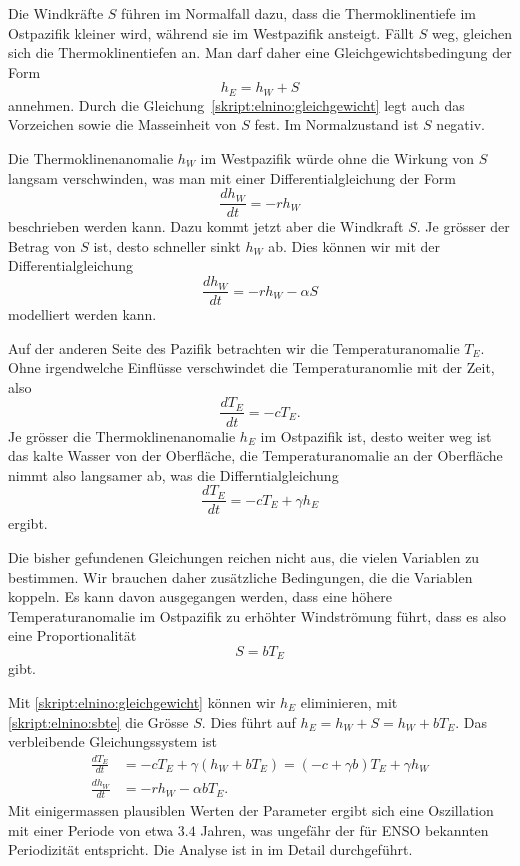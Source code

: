 Die Windkräfte $S$ führen im Normalfall dazu, dass die Thermoklinentiefe
im Ostpazifik kleiner wird, während sie im Westpazifik ansteigt.
Fällt $S$ weg, gleichen sich die Thermoklinentiefen an.
Man darf daher eine Gleichgewichtsbedingung der Form
\begin{equation}
h_E = h_W + S
\label{skript:elnino:gleichgewicht}
\end{equation}
annehmen.
Durch die Gleichung~\ref{skript:elnino:gleichgewicht} legt auch
das Vorzeichen sowie die Masseinheit von $S$ fest.
Im Normalzustand ist $S$ negativ.

Die Thermoklinenanomalie $h_W$ im Westpazifik würde ohne die Wirkung
von $S$ langsam verschwinden, was man mit einer Differentialgleichung
der Form
\[
\frac{dh_W}{dt} = -rh_W
\]
beschrieben werden kann.
Dazu kommt jetzt aber die Windkraft $S$.
Je grösser der Betrag von $S$ ist, desto schneller sinkt $h_W$ ab.
Dies können wir mit der Differentialgleichung
\begin{equation}
\frac{dh_W}{dt}
=
-rh_W -\alpha S
\end{equation}
modelliert werden kann.

Auf der anderen Seite des Pazifik betrachten wir die Temperaturanomalie
$T_E$.
Ohne irgendwelche Einflüsse verschwindet die Temperaturanomlie mit der
Zeit, also
\[
\frac{dT_E}{dt} = -cT_E.
\]
Je grösser die Thermoklinenanomalie $h_E$ im Ostpazifik ist, desto weiter
weg ist das kalte Wasser von der Oberfläche, die Temperaturanomalie an
der Oberfläche nimmt also langsamer ab, was die Differntialgleichung
\begin{equation}
\frac{dT_E}{dt} = -cT_E + \gamma h_E
\end{equation}
ergibt.

Die bisher gefundenen Gleichungen reichen nicht aus, die vielen Variablen
zu bestimmen.
Wir brauchen daher zusätzliche Bedingungen, die die Variablen koppeln.
Es kann davon ausgegangen werden, dass eine höhere Temperaturanomalie
im Ostpazifik zu erhöhter Windströmung führt, dass es also eine
Proportionalität 
\begin{equation}
S=bT_E
\label{skript:elnino:sbte}
\end{equation}
gibt.

Mit \eqref{skript:elnino:gleichgewicht} können wir $h_E$ eliminieren,
mit \eqref{skript:elnino:sbte} die Grösse $S$.
Dies führt auf $h_E=h_W+S=h_W+bT_E$.
Das verbleibende Gleichungssystem ist
\begin{align*}
\frac{dT_E}{dt}
&=
-cT_E + \gamma(h_W+bT_E)
=
(-c+\gamma b)T_E
+
\gamma h_W
\\
\frac{dh_W}{dt}
&=
-rh_W - \alpha b T_E.
\end{align*}
Mit einigermassen plausiblen Werten der Parameter ergibt sich eine
Oszillation mit einer Periode von etwa $3.4$ Jahren, was ungefähr der
für ENSO bekannten Periodizität entspricht.
Die Analyse ist in \cite{skript:kaperengler} im Detail durchgeführt.


